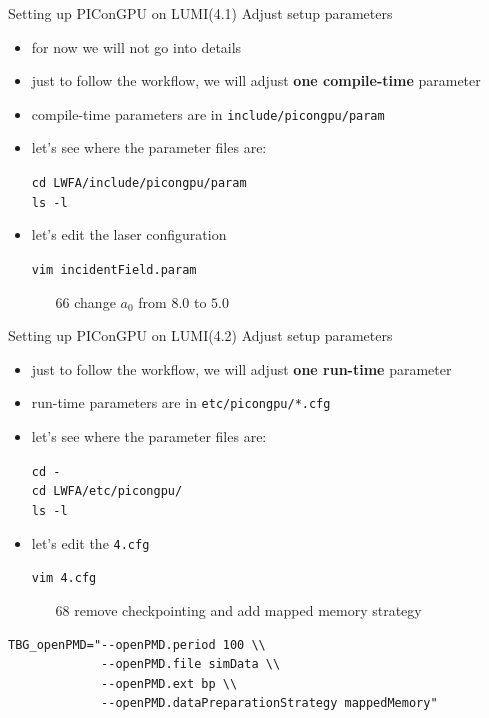 \documentclass[
  aspectratio=169,
  10pt
]{beamer}
\newcommand{\terminal}[1]{\par\noindent\colorbox{shadecolor}
{\parbox{\dimexpr\textwidth-2\fboxsep\relax}{\texttt{#1}}}}
\begin{document}
\begin{frame}[t,fragile]{Setting up PIConGPU on LUMI}{(4.1) Adjust setup parameters}

\begin{itemize}
    \item for now we will not go into details
    \item just to follow the workflow, we will adjust \textbf{one compile-time} parameter
    \item compile-time parameters are in \texttt{include/picongpu/param}
    \item let's see where the parameter files are:
    \terminal{cd LWFA/include/picongpu/param \\
    ls -l}
    \item let's edit the laser configuration
    \terminal{vim incidentField.param}
    \begin{enumerate}
        \item[66] change $a_0$ from $8.0$ to $5.0$ 
    \end{enumerate}

\end{itemize}

\end{frame}




\begin{frame}[t,fragile]{Setting up PIConGPU on LUMI}{(4.2) Adjust setup parameters}

\begin{itemize}
    \item just to follow the workflow, we will adjust \textbf{one run-time} parameter
    \item run-time parameters are in \texttt{etc/picongpu/*.cfg}
    \item let's see where the parameter files are:
    \terminal{cd - \\ cd LWFA/etc/picongpu/ \\
    ls -l}
    \item let's edit the \texttt{4.cfg}
    \terminal{vim 4.cfg}
    \begin{enumerate}
        \item[68] remove checkpointing and add mapped memory strategy
    \end{enumerate}
\end{itemize}


\begin{verbatim}
TBG_openPMD="--openPMD.period 100 \\
             --openPMD.file simData \\
             --openPMD.ext bp \\
             --openPMD.dataPreparationStrategy mappedMemory"
\end{verbatim}



\end{frame}
\end{document}
